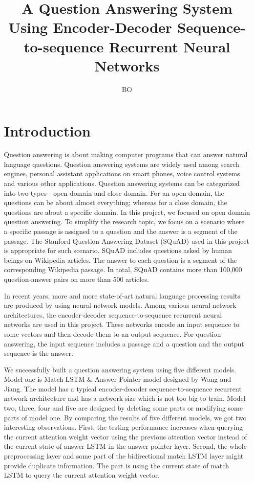 \documentclass[modernstyle,12pt]{sjsuthesis}
\title{A Question Answering System Using Encoder-Decoder Sequence-to-sequence Recurrent Neural Networks}
\author{BO}{LI}
\theoremstyle{definition}
\begin{document}
\raggedright          %
\parindent=30pt       %




\chapter{Introduction}

Question answering is about making computer programs that can answer natural language questions. Question answering systems are widely used among search engines, personal assistant applications on smart phones, voice control systems and various other applications. Question answering systems can be categorized into two types - open domain and close domain. For an open domain, the questions can be about almost everything; whereas for a close domain, the questions are about a specific domain. In this project, we focused on open domain question answering. To simplify the research topic, we focus on a scenario where a specific passage is assigned to a question and the answer is a segment of the passage. The Stanford Question Answering Dataset (SQuAD) used in this project is appropriate for such scenario. SQuAD includes questions asked by human beings on Wikipedia articles\cite{rajpurkar2016squad}. The answer to each question is a segment of the corresponding Wikipedia passage. In total, SQuAD contains more than 100,000 question-answer pairs on more than 500 articles.

In recent years, more and more state-of-art natural language processing results are produced by using neural network models. Among various neural network architectures, the encoder-decoder sequence-to-sequence recurrent neural networks are used in this project. These networks encode an input sequence to some vectors and then decode them to an output sequence. For question answering, the input sequence includes a passage and a question and the output sequence is the answer.


We successfully built a question answering system using five different models. Model one is Match-LSTM \& Answer Pointer model designed by Wang and Jiang\cite{wang2016machine}. The model has a typical encoder-decoder sequence-to-sequence recurrent network architecture and has a network size which is not too big to train. Model two, three, four and five are designed by deleting some parts or modifying some parts of model one. By comparing the results of five different models, we got two interesting observations. First, the testing performance increases when querying the current attention weight vector using the previous attention vector instead of the current state of answer LSTM in the answer pointer layer. Second, the whole preprocessing layer and some part of the bidirectional match LSTM layer might provide duplicate information. The part is using the current state of match LSTM to query the current attention weight vector.
\end{document}
